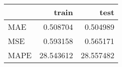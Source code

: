 \begin{tabular}{lrr}
\toprule
{} &      train &       test \\
\midrule
MAE  &   0.508704 &   0.504989 \\
MSE  &   0.593158 &   0.565171 \\
MAPE &  28.543612 &  28.557482 \\
\bottomrule
\end{tabular}
